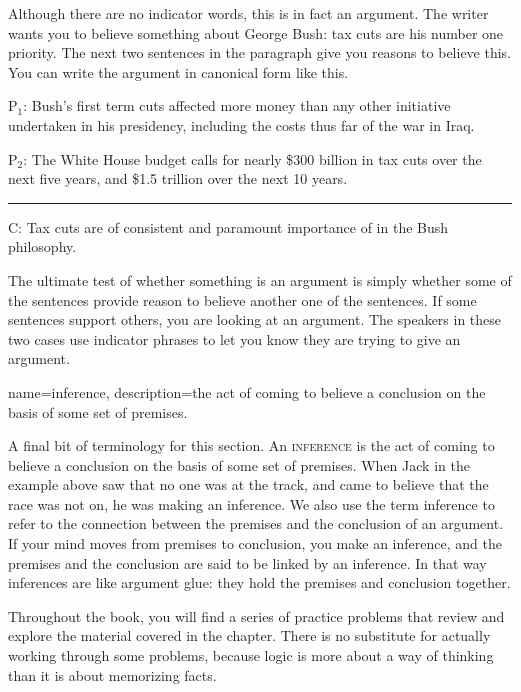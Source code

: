 Although there are no indicator words, this is in fact an argument. The writer wants you to believe something about George Bush: tax cuts are his number one priority. The next two sentences in the paragraph give you reasons to believe this. You can write the argument in canonical form like this.

\begin{earg}
\item[P$_1$:] Bush's first term cuts affected more money than any other initiative undertaken in his presidency, including the costs thus far of the war in Iraq. 
\item[P$_2$:] The White House budget calls for nearly \$300 billion in tax cuts over the next five years, and \$1.5 trillion over the next 10 years. 
\vspace{-.5em}
\item [] \rule{0.9\linewidth}{.5pt} 
\item[C:] Tax cuts are of consistent and paramount importance of in the Bush philosophy.
\end{earg} 

The ultimate test of whether something is an argument is simply whether some of the sentences provide reason to believe another one of the sentences. If some sentences support others, you are looking at an argument. The speakers in these two cases use indicator phrases to let you know they are trying to give an argument.

{
name=inference,
description={the act of coming to believe a conclusion on the basis of some set of premises.}
}

A final bit of terminology for this section. An \textsc{\gls{inference}} \label{def:Inference} is the act of coming to believe a conclusion on the basis of some set of premises. When Jack in the example above saw that no one was at the track, and came to believe that the race was not on, he was making an inference. We also use the term inference to refer to the connection between the premises and the conclusion of an argument. If your mind moves from premises to conclusion, you make an inference, and the premises and the conclusion are said to be linked by an inference. In that way inferences are like argument glue: they hold the premises and conclusion together. 


\practiceproblems
Throughout the book, you will find a series of practice problems that review and explore the material covered in the chapter. There is no substitute for actually working through some problems, because logic is more about a way of thinking than it is about memorizing facts. %

